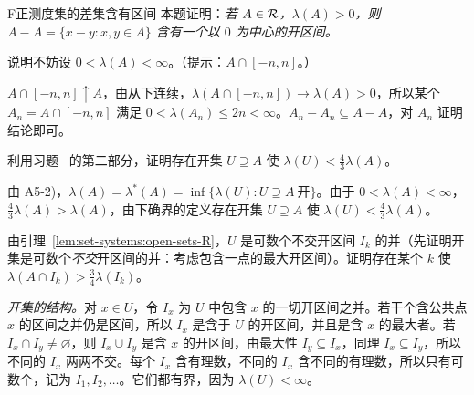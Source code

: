 \begin{probleme}{F}{正测度集的差集含有区间}
本题证明：\emph{若 $A\in\mathcal{R}$，$\lambda(A)>0$，则 $A-A=\{x-y:x,y\in A\}$ 含有一个以 $0$ 为中心的开区间。}
\begin{questions}
\item 说明不妨设 $0<\lambda(A)<\infty$。（提示：$A\cap[-n,n]$。）
\begin{solution}
$A\cap[-n,n]\uparrow A$，由从下连续，$\lambda(A\cap[-n,n])\to\lambda(A)>0$，所以某个 $A_n=A\cap[-n,n]$ 满足 $0<\lambda(A_n)\leqslant2n<\infty$。$A_n-A_n\subseteq A-A$，对 $A_n$ 证明结论即可。
\end{solution}
\item 利用习题~ 的第二部分，证明存在开集 $U\supseteq A$ 使 $\lambda(U)<\frac43\lambda(A)$。
\begin{solution}
由 A5-2)，$\lambda(A)=\lambda^*(A)=\inf\{\lambda(U):U\supseteq A\ \text{开}\}$。由于 $0<\lambda(A)<\infty$，$\frac43\lambda(A)>\lambda(A)$，由下确界的定义存在开集 $U\supseteq A$ 使 $\lambda(U)<\frac43\lambda(A)$。
\end{solution}
\item 由引理~\ref{lem:set-systems:open-sets-R}，$U$ 是可数个不交开区间 $I_k$ 的并（先证明开集是可数个\emph{不交}开区间的并：考虑包含一点的最大开区间）。证明存在某个 $k$ 使 $\lambda(A\cap I_k)>\frac34\lambda(I_k)$。
\begin{solution}
\emph{开集的结构。}对 $x\in U$，令 $I_x$ 为 $U$ 中包含 $x$ 的一切开区间之并。若干个含公共点 $x$ 的区间之并仍是区间，所以 $I_x$ 是含于 $U$ 的开区间，并且是含 $x$ 的最大者。若 $I_x\cap I_y\neq\varnothing$，则 $I_x\cup I_y$ 是含 $x$ 的开区间，由最大性 $I_y\subseteq I_x$，同理 $I_x\subseteq I_y$，所以不同的 $I_x$ 两两不交。每个 $I_x$ 含有理数，不同的 $I_x$ 含不同的有理数，所以只有可数个，记为 $I_1,I_2,\dots$。它们都有界，因为 $\lambda(U)<\infty$。


\end{solution}
\end{questions}
\end{probleme}
